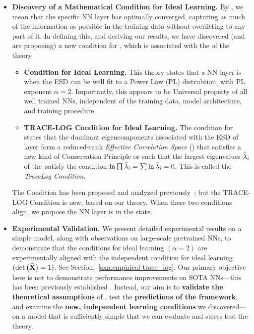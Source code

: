 \begin{itemize}
   \item 
     \textbf{Discovery of a Mathematical Condition for Ideal Learning.}
     By \IdealLearning, we mean that the specific NN layer has optimally converged, capturing as
     much of the information as possible in the training data without overfitting to any part of it.
     In defining this, and deriving our results, we have discovered (and are proposing) a new condition
     for \IdealLearning, which is associated with the \Universality of the \HTSR theory
   \begin{itemize}
      \item 
        \textbf{\HTSR Condition for Ideal Learning.}
        This \HTSR theory states that a NN layer is \Ideal  when the ESD can be well fit to a
        Power Law (PL) distrubtion, with PL exponent $\alpha = 2$. Importantly, 
        this appears to be Universal property of all well trained NNs, independent of the training data,
        model architecture, and training procedure.
      \item 
        \textbf{\SETOL TRACE-LOG Condition  for Ideal Learning.}
        The \SETOL condition for \IdealLearning states that the 
        dominant eigencomponents associated with the ESD 
        of layer form a reduced-rank \emph{Effective Correlation Space} (\ECS) that satisfies
        a new kind of Conservation Principle
        or \emph{\VolumePreservingTransformation} such that the largest eigenvalues $\tilde{\lambda}_{i}$ of the~\ECS satisfy
        the condition  $\ln \prod \tilde{\lambda}_{i} = \sum \ln \tilde{\lambda}_{i} = 0$.  
        This is called the \emph{TraceLog Condition}.
   \end{itemize}

   The \HTSR Condition has been proposed and analyzed previously~\cite{MM18_TR_JMLRversion,MM20a_trends_NatComm,YTHx23_KDD}; but
   the TRACE-LOG Condition is new, based on our \SETOL theory.
   When these two conditions align, we propose the NN layer is in the \Ideal state.

   \item 
   \textbf{Experimental Validation.} 
   We present detailed experimental results on a simple model, along with observations on large-scale pretrained NNs, to demonstrate that the \HTSR conditions for ideal learning $(\alpha = 2)$ are experimentally aligned with the independent \SETOL condition for ideal learning
   $(\mbox{}{\text{det}}\left(\tilde{\mathbf{X}}\right)=1)$. 
   See Section.~\ref{sxn:empirical-trace_log}.
   Our primary objective here is not to demonstrate performance improvements on SOTA NNs---this has been previously established \cite{NEURIPS2023_CHM}. 
   Instead, our aim is to \textbf{validate the theoretical assumptions} of \SETOL, test the \textbf{predictions of the \SETOL framework}, and examine the \textbf{new, independent learning conditions} we discovered---on a model that is sufficiently simple that we can evaluate and stress test the theory.


\end{itemize}
